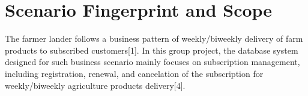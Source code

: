 \tableofcontents
\clearpage
{}   %

\section{Scenario Fingerprint and Scope}
\label{sec:fingerprint}

The farmer lander follows a business pattern of weekly/biweekly delivery of farm products to subscribed customers[1]. In this group project, the database system designed for such business scenario mainly focuses on subscription management, including registration, renewal, and cancelation of the subscription for weekly/biweekly agriculture products delivery[4].

